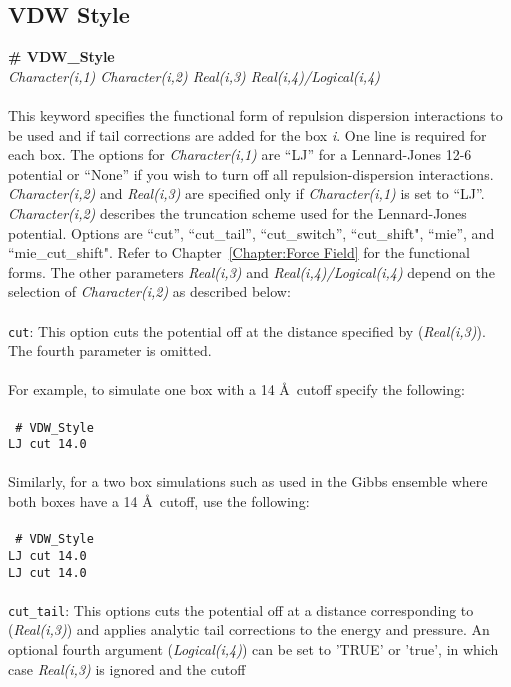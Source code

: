 \subsection{VDW Style}\label{sec:VDW_Style}
{\bf \# VDW\_Style} \\
{\it Character(i,1)  Character(i,2) Real(i,3) Real(i,4)/Logical(i,4)} \\ \\
%
This keyword specifies the functional form of repulsion dispersion
interactions to be used and if tail corrections are added for the box
\emph{i}. One line is required for each box. 
The options for {\it Character(i,1)} are ``LJ'' for a Lennard-Jones
12-6 potential or ``None'' if you wish to turn off all
repulsion-dispersion interactions. {\it Character(i,2)} and {\it Real(i,3)}
 are specified only if {\it Character(i,1)} is set to ``LJ''. {\it Character(i,2)}
 describes the truncation scheme used for the Lennard-Jones potential.
Options are ``cut'', ``cut\_tail'', ``cut\_switch'',
``cut\_shift", ``mie'', and ``mie\_cut\_shift". Refer to Chapter~\ref{Chapter:Force Field} for the
functional forms.
 The other parameters
\emph{Real(i,3)} and \emph{Real(i,4)/Logical(i,4)} depend on the
selection of \emph{Character(i,2)} as described below:\\ \\
%
\texttt{cut}: This option cuts the  potential  off at the  distance
specified by (\emph{Real(i,3)}). The fourth parameter is omitted. \\ \\
%
For example, to simulate one box with a 14 \AA\ cutoff specify the following:
\\ \\
\texttt{
\# VDW\_Style \\
LJ cut 14.0 } \\ \\
%
Similarly, for a two box simulations such as used in the Gibbs
ensemble where both boxes have a 14 \AA\ cutoff, use the
following: \\ \\
\texttt{
\# VDW\_Style \\
LJ cut 14.0 \\
LJ cut 14.0 } \\ \\
%
\texttt{cut\_tail}: This options cuts the potential off at a distance
corresponding to (\emph{Real(i,3)}) and applies analytic tail
corrections to the energy and pressure. An optional fourth argument
(\emph{Logical(i,4)}) can be set 
to 'TRUE' or 'true', in which case \emph{Real(i,3)} is ignored and the cutoff
